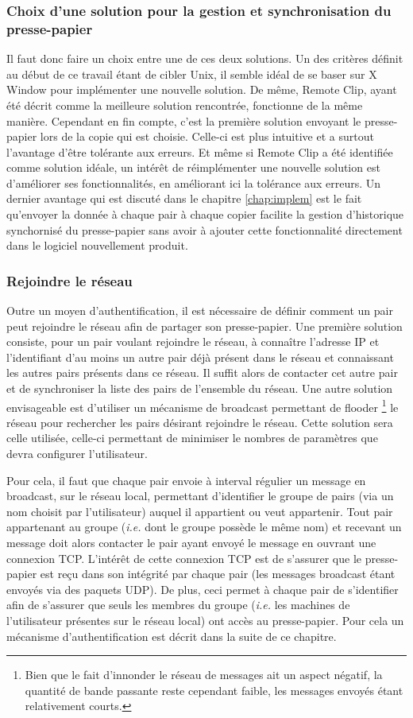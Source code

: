 \subsubsection{Choix d'une solution pour la gestion et
synchronisation du presse-papier}
Il faut donc faire un choix entre une de ces deux solutions. Un des critères
définit au début de ce travail étant de cibler Unix, il semble idéal de se
baser sur X Window pour implémenter une nouvelle solution. De même, Remote
Clip, ayant été décrit comme la meilleure solution rencontrée, fonctionne
de la même manière. Cependant en fin compte, c'est la première solution
envoyant le presse-papier lors de la copie qui est choisie.
Celle-ci est plus intuitive et a surtout l'avantage d'être
tolérante aux erreurs. Et même si Remote Clip a été identifiée comme
solution idéale, un intérêt de réimplémenter une nouvelle solution est
d'améliorer ses fonctionnalités, en améliorant ici la tolérance aux erreurs.
Un dernier avantage qui est discuté dans le chapitre \ref{chap:implem}
est le fait qu'envoyer la donnée à chaque pair à chaque copier facilite
la gestion d'historique synchornisé du presse-papier sans avoir à ajouter
cette fonctionnalité directement dans le logiciel nouvellement produit.

\subsubsection{Rejoindre le réseau}
Outre un moyen d'authentification, il est nécessaire de définir comment
un pair peut rejoindre le réseau afin de partager son presse-papier.
Une première solution consiste, pour un pair voulant
rejoindre le réseau, à connaître l'adresse IP et l'identifiant d'au moins un
autre pair déjà présent dans le réseau et connaissant les autres pairs présents
dans ce réseau. Il suffit alors de contacter cet autre pair et de synchroniser
la  liste des pairs de l'ensemble du réseau. Une autre solution envisageable
est d'utiliser un mécanisme de broadcast permettant de flooder
\footnote{Bien que le fait d'innonder le réseau de messages ait un aspect
négatif, la quantité de bande passante reste cependant faible, les messages
envoyés étant relativement courts.} le réseau pour
rechercher les pairs désirant rejoindre le réseau. Cette solution sera celle
utilisée, celle-ci permettant de minimiser le nombres de paramètres que devra
configurer l'utilisateur.

Pour cela, il faut que chaque pair envoie à interval régulier un message
en broadcast, sur le réseau local, permettant d'identifier le groupe de pairs
(via un nom choisit par l'utilisateur)
auquel il appartient ou veut appartenir. Tout pair appartenant au groupe
(\emph{i.e.} dont le groupe possède le même nom) et
recevant un message doit alors contacter le pair ayant envoyé le message en
ouvrant une connexion TCP. L'intérêt de cette connexion TCP est de s'assurer
que le presse-papier est reçu dans son intégrité par chaque pair (les
messages broadcast étant envoyés via des paquets UDP). De plus,
ceci permet à chaque pair de s'identifier afin de s'assurer que seuls
les membres du groupe (\emph{i.e.} les machines de l'utilisateur présentes
sur le réseau local) ont accès au presse-papier. Pour cela un
mécanisme d'authentification est décrit dans la suite de ce chapitre.

